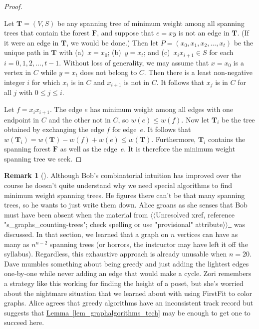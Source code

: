 \documentclass[10pt,]{book}
\theoremstyle{plain}
\theoremstyle{definition}
\theoremstyle{definition}
\newtheorem{remark}[theorem]{Remark}
\theoremstyle{definition}
\theoremstyle{definition}
\numberwithin{equation}{section}
\newcommand{\bfF}{\mathbf{F}}
\newcommand{\bfT}{\mathbf{T}}
\begin{document}
\begin{proof}\hypertarget{proof-7}{}
\hypertarget{p-174}{}%
Let \(\bfT=(V,S)\) be any spanning tree of minimum weight among all spanning trees that contain the forest \(\bfF\), and suppose that \(e=xy\) is not an edge in \(\bfT\). (If it were an edge in \(\bfT\), we would be done.) Then let \(P=(x_0,x_1,x_2,\dots,x_t)\) be the unique path in \(\bfT\) with (a)~\(x=x_0\); (b)~\(y=x_t\); and (c)~\(x_ix_{i+1}\in S\) for each \(i=0,1,2,\dots,t-1\). Without loss of generality, we may assume that \(x=x_0\) is a vertex in \(C\) while \(y=x_t\) does not belong to \(C\). Then there is a least non-negative integer \(i\) for which \(x_i\) is in \(C\) and \(x_{i+1}\) is not in \(C\). It follows that \(x_j\) is in \(C\) for all \(j\) with \(0\le j\le i\).%
\par
\hypertarget{p-175}{}%
Let \(f=x_ix_{i+1}\). The edge \(e\) has minimum weight among all edges with one endpoint in \(C\) and the other not in \(C\), so \(w(e)\le w(f)\). Now let \(\bfT_i\) be the tree obtained by exchanging the edge \(f\) for edge~\(e\). It follows that \(w(\bfT_i) = w(\bfT) - w(f) +w(e)\le w(\bfT)\). Furthermore, \(\bfT_i\) contains the spanning forest \(\bfF\) as well as the edge~\(e\). It is therefore the minimum weight spanning tree we seek.%
\end{proof}
\begin{remark}[]\label{remark-2}
\hypertarget{p-176}{}%
Although Bob's combinatorial intuition has improved over the course he doesn't quite understand why we need special algorithms to find minimum weight spanning trees. He figures there can't be that many spanning trees, so he wants to just write them down. Alice groans as she senses that Bob must have been absent when the material from {$\langle\langle$Unresolved xref, reference "s\_graphs\_counting-trees"; check spelling or use "provisional" attribute$\rangle\rangle$}\hyperlink{}{~} was discussed. In that section, we learned that a graph on \(n\) vertices can have as many as \(n^{n-2}\) spanning trees (or horrors, the instructor may have left it off the syllabus). Regardless, this exhaustive approach is already unusable when \(n = 20\). Dave mumbles something about being greedy and just adding the lightest edges one-by-one while never adding an edge that would make a cycle. Zori remembers a strategy like this working for finding the height of a poset, but she's worried about the nightmare situation that we learned about with using FirstFit to color graphs. Alice agrees that greedy algorithms have an inconsistent track record but suggests that \hyperref[lem_graphalgorithms_tech]{Lemma~\ref{lem_graphalgorithms_tech}} may be enough to get one to succeed here.%
\end{remark}
\typeout{************************************************}
\typeout{************************************************}
\end{document}
